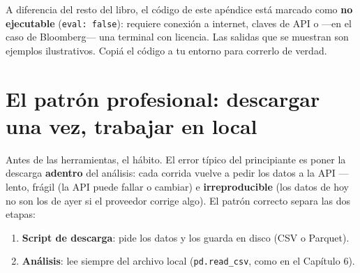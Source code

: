 \documentclass[
  spanish,
  letterpaper,
  DIV=11,
  numbers=noendperiod]{scrreprt}
\providecommand{\tightlist}{%
  \setlength{\itemsep}{0pt}\setlength{\parskip}{0pt}}
\begin{document}
\begin{tcolorbox}[enhanced jigsaw, bottomrule=.15mm, colback=white, opacitybacktitle=0.6, arc=.35mm, toprule=.15mm, opacityback=0, breakable, titlerule=0mm, left=2mm, coltitle=black, colbacktitle=quarto-callout-warning-color!10!white, colframe=quarto-callout-warning-color-frame, leftrule=.75mm, toptitle=1mm, bottomtitle=1mm, title=\textcolor{quarto-callout-warning-color}{\faExclamationTriangle}\hspace{0.5em}{Los bloques de este apéndice no se ejecutan en el libro}, rightrule=.15mm]

A diferencia del resto del libro, el código de este apéndice está
marcado como \textbf{no ejecutable} (\texttt{eval:\ false}): requiere
conexión a internet, claves de API o ---en el caso de Bloomberg--- una
terminal con licencia. Las salidas que se muestran son ejemplos
ilustrativos. Copiá el código a tu entorno para correrlo de verdad.

\end{tcolorbox}

\section{El patrón profesional: descargar una vez, trabajar en
local}\label{el-patruxf3n-profesional-descargar-una-vez-trabajar-en-local}

Antes de las herramientas, el hábito. El error típico del principiante
es poner la descarga \textbf{adentro} del análisis: cada corrida vuelve
a pedir los datos a la API --- lento, frágil (la API puede fallar o
cambiar) e \textbf{irreproducible} (los datos de hoy no son los de ayer
si el proveedor corrige algo). El patrón correcto separa las dos etapas:

\begin{enumerate}
\def\labelenumi{\arabic{enumi}.}
\tightlist
\item
  \textbf{Script de descarga}: pide los datos y los guarda en disco (CSV
  o Parquet).
\item
  \textbf{Análisis}: lee siempre del archivo local
  (\texttt{pd.read\_csv}, como en el Capítulo 6).
\end{enumerate}
\end{document}
